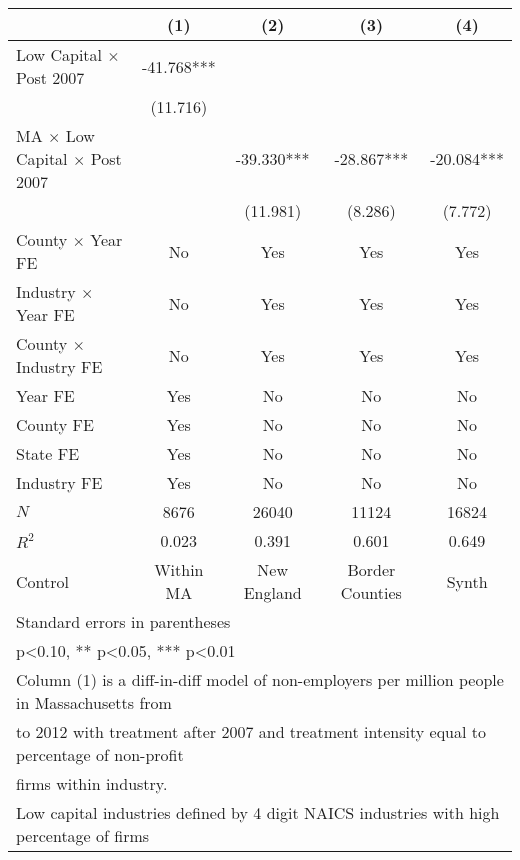 {
\def\sym#1{\ifmmode^{#1}\else\(^{#1}\)\fi}
\begin{tabular}{l*{4}{c}}
\hline\hline
          &\multicolumn{1}{c}{(1)}&\multicolumn{1}{c}{(2)}&\multicolumn{1}{c}{(3)}&\multicolumn{1}{c}{(4)}\\
\hline
Low Capital $\times$ Post 2007&  -41.768***&            &            &            \\
          & (11.716)   &            &            &            \\
MA $\times$ Low Capital $\times$ Post 2007&            &  -39.330***&  -28.867***&  -20.084***\\
          &            & (11.981)   &  (8.286)   &  (7.772)   \\
County $\times$ Year FE &       No   &      Yes   &      Yes   &      Yes   \\
Industry $\times$ Year FE &       No   &      Yes   &      Yes   &      Yes   \\
County $\times$ Industry FE &       No   &      Yes   &      Yes   &      Yes   \\
Year FE   &      Yes   &       No   &       No   &       No   \\
County FE &      Yes   &       No   &       No   &       No   \\
State FE  &      Yes   &       No   &       No   &       No   \\
Industry FE &      Yes   &       No   &       No   &       No   \\
\hline
\(N\)     &     8676   &    26040   &    11124   &    16824   \\
\(R^{2}\) &    0.023   &    0.391   &    0.601   &    0.649   \\
Control   &Within MA   &New England   &Border Counties   &    Synth   \\
\hline\hline
\multicolumn{5}{l}{\footnotesize Standard errors in parentheses}\\
\multicolumn{5}{l}{\footnotesize * p<0.10, ** p<0.05, *** p<0.01}\\
\multicolumn{5}{l}{\footnotesize Column (1) is a diff-in-diff model of non-employers per million people in Massachusetts from  }\\ 
\multicolumn{5}{l}{\footnotesize \space 2000 to 2012 with treatment after 2007 and treatment intensity equal to percentage of non-profit}\\ 
\multicolumn{5}{l}{\footnotesize \space firms within industry.}\\ 
\multicolumn{5}{l}{\footnotesize Low capital industries defined by 4 digit NAICS industries with high percentage of firms }\\

\end{tabular}}
